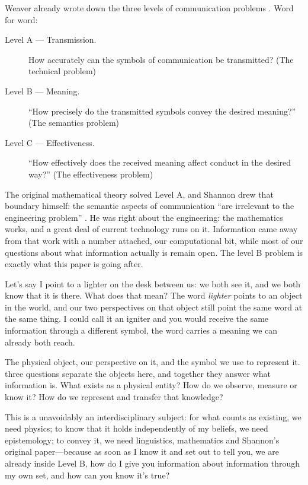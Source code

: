 \documentclass[11pt,a4paper]{article}
\theoremstyle{definition}
\begin{document}
Weaver already wrote down the three levels of communication problems
\citep[pp.~4--5]{ShannonWeaver1949}. Word for word:
\begin{description}
  \item[Level A --- Transmission.] How accurately can the symbols of
  communication be transmitted? (The technical problem)
  \item[Level B --- Meaning.] ``How precisely do the transmitted symbols
  convey the desired meaning?'' (The semantics problem)
  \item[Level C --- Effectiveness.] ``How effectively does the received
  meaning affect conduct in the desired way?'' (The effectiveness problem)
\end{description}
The original mathematical theory solved Level A, and Shannon drew that
boundary himself: the semantic aspects of communication ``are irrelevant
to the engineering problem'' \citep[p.~379]{Shannon1948}. He was right about the engineering: the mathematics works, and a great deal of current technology runs on it. Information came away from that work with a number attached, our computational bit, while most of our questions about what information actually is remain open. The level B problem is exactly what this paper is going after.

Let's say I point to a lighter on the desk between us: we both see it, and we both
know that it is there. What does that mean? The word \emph{lighter}
points to an object in the world, and our two perspectives on that
object still point the same word at the same thing. I could call it an
igniter and you would receive the same information through a different
symbol, the word carries a meaning we can already both reach.

The physical object, our perspective on it, and the symbol we use to represent it. three questions separate the objects here, and together they answer what information
is. What exists as a physical entity? How do we observe, measure or know it? How do we represent and transfer that knowledge?

This is a unavoidably an interdisciplinary subject: for what counts as existing, we need physics; to know that it holds
independently of my beliefs, we need epistemology; to convey it, we need
linguistics, mathematics and Shannon's original paper---because as soon
as I know it and set out to tell you, we are already inside Level B, how do I give you information about information through my own set, and how can you know it's true?
\end{document}
